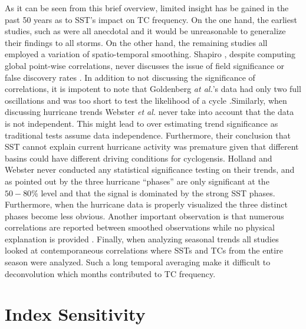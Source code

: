 \documentclass[a4paper,10pt]{article}
\begin{document}
As it can be seen from this brief overview, limited insight has be gained in the past 50 years as to SST's impact on TC frequency. On the one hand, the earliest studies, such as \cite{palmen1948,fisher1958,gray1968,carlson1971} were all anecdotal and it would be unreasonable to generalize their findings to all storms. On the other hand, the remaining studies all employed a variation of spatio-temporal smoothing. Shapiro \cite{shapiro1982}, despite computing global point-wise correlations, never discusses the issue of field significance \cite{livezey1983} or false discovery rates \cite{benjamini2001}. In addition to not discussing the significance of correlations, it is impotent to note that Goldenberg \textit{at al.}'s \cite{goldenberg2001} data had only two full oscillations and was too short to test the likelihood of a cycle \cite{aberson2009}.Similarly, when discussing hurricane trends Webster \textit{et al.} \cite{webster2005} never take into account that the data is not independent. This might lead to over estimating trend significance as traditional tests assume data independence. Furthermore, their conclusion that SST cannot explain current hurricane activity was premature given that different basins could have different driving conditions for cyclogensis. Holland and Webster \cite{holland2007} never conducted any statistical significance testing on their trends, and as pointed out by \cite{aberson2009} the three hurricane ``phases'' are only significant at the $50-80\%$ level and that the signal is dominated by the strong SST phases. Furthermore, when the hurricane data is properly visualized the three distinct phases become less obvious. Another important observation is that numerous correlations are reported between smoothed observations while no physical explanation is provided \cite{goldenberg2001, webster2005}. Finally, when analyzing seasonal trends all studies looked at contemporaneous correlations where SSTs and TCs from the entire season were analyzed. Such a long temporal averaging make it difficult to deconvolution which months contributed to TC frequency.

\section{Index Sensitivity}
\end{document}
